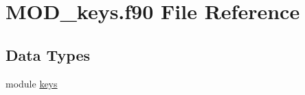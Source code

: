 \hypertarget{MOD__keys_8f90}{\section{M\-O\-D\-\_\-keys.\-f90 File Reference}
\label{MOD__keys_8f90}
}
\subsection*{Data Types}
\begin{DoxyCompactItemize}
\item 
module \hyperlink{classkeys}{keys}
\end{DoxyCompactItemize}
